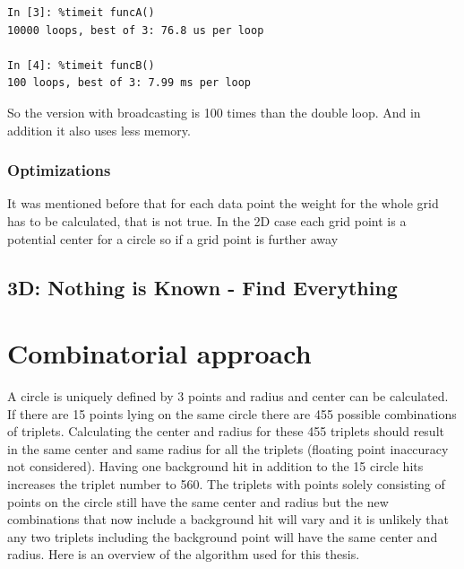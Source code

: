 \documentclass[10pt,twoside]{scrreprt}
\begin{document}
\begin{lstlisting}
In [3]: %timeit funcA()
10000 loops, best of 3: 76.8 us per loop

In [4]: %timeit funcB()
100 loops, best of 3: 7.99 ms per loop
\end{lstlisting}
So the version with broadcasting is 100 times than the double loop. And in addition it also uses less memory.

\subsubsection{Optimizations} %
\label{ssub:optimizations}
It was mentioned before that for each data point the weight for the whole grid has to be calculated, that is not true. In the 2D case each grid point is a potential center for a circle so if a grid point is further away



\subsection{3D: Nothing is Known - Find Everything} %
\label{sub:3d_nothing_is_known_find_everything}



\section{Combinatorial approach}
\label{sec:combinatorial_approach}
A circle is uniquely defined by 3 points and radius and center can be calculated. If there are 15 points lying on the same circle there are 455 possible combinations of triplets. Calculating the center and radius for these 455 triplets should result in the same center and same radius for all the triplets (floating point inaccuracy not considered). Having one background hit in addition to the 15 circle hits increases the triplet number to 560. The triplets with points solely consisting of points on the circle still have the same center and radius but the new combinations that now include a background hit will vary and it is unlikely that any two triplets including the background point will have the same center and radius. 
Here is an overview of the algorithm used for this thesis.
\end{document}
